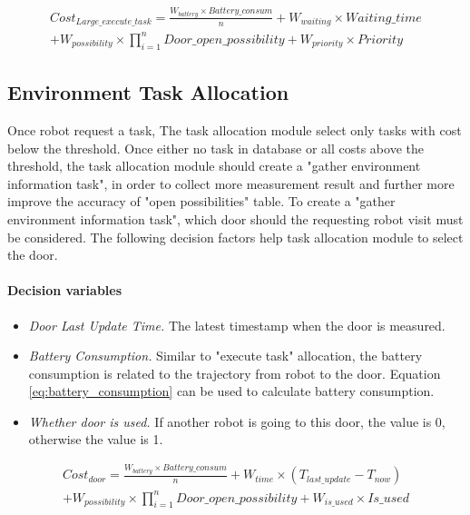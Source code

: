 \begin{equation}
	\label{eq:large_execute_task_cost}
	\begin{split}
	Cost_{Large\_execute\_task} = \frac{W_{battery} \times Battery\_consum}{n} + W_{waiting} \times Waiting\_time \\
	+ W_{possibility} \times \prod\limits_{i=1}^n Door\_open\_possibility  + W_{priority} \times Priority
	\end{split}
\end{equation}


\subsection{Environment Task Allocation}
Once robot request a task, The task allocation module select only tasks with cost below the threshold. Once either no task in database or all costs above the threshold, 
the task allocation module should create a "gather environment information task", in order to collect more measurement result and further more improve the accuracy of "open possibilities" table.
To create a "gather environment information task", which door should the requesting robot visit must be considered. The following decision factors help task allocation module to select the door.

\paragraph*{Decision variables}
\begin{itemize}
	\item \textsl{Door Last Update Time.} The latest timestamp when the door is measured.
	\item \textsl{Battery Consumption.} Similar to "execute task" allocation, the battery consumption is related to the trajectory from robot to the door. Equation \ref{eq:battery_consumption} can be used to calculate battery consumption.
	\item \textsl{Whether door is used.} If another robot is going to this door, the value is 0, otherwise the value is 1.
\end{itemize}

\begin{equation}
	\label{eq:door_cost}
	\begin{split}
	Cost_{door} = \frac{W_{battery} \times Battery\_consum}{n} + W_{time} \times (T_{last\_update} - T_{now}) \\
	+ W_{possibility} \times \prod\limits_{i=1}^n Door\_open\_possibility + W_{is\_used} \times Is\_used  
	\end{split}
\end{equation}

